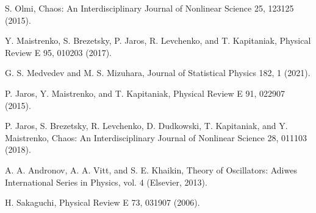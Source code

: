 \documentclass[a4paper,12pt, titlepage]{report} %
\theoremstyle{plain}
\begin{document}
\begin{thebibliography}{10}
    S. Olmi, Chaos: An Interdisciplinary Journal of Nonlinear Science 25, 123125 (2015).

    Y. Maistrenko, S. Brezetsky, P. Jaros, R. Levchenko, and T. Kapitaniak, Physical Review E 95, 010203 (2017).

    G. S. Medvedev and M. S. Mizuhara, Journal of Statistical Physics 182, 1 (2021).

    P. Jaros, Y. Maistrenko, and T. Kapitaniak, Physical Review E 91, 022907 (2015).

    P. Jaros, S. Brezetsky, R. Levchenko, D. Dudkowski, T. Kapitaniak, and Y. Maistrenko, Chaos: An Interdisciplinary Journal of Nonlinear Science 28, 011103 (2018).

    A. A. Andronov, A. A. Vitt, and S. E. Khaikin, Theory of Oscillators: Adiwes International Series in Physics, vol. 4 (Elsevier, 2013).

    H. Sakaguchi, Physical Review E 73, 031907 (2006).

  \end{thebibliography}
\end{document}
